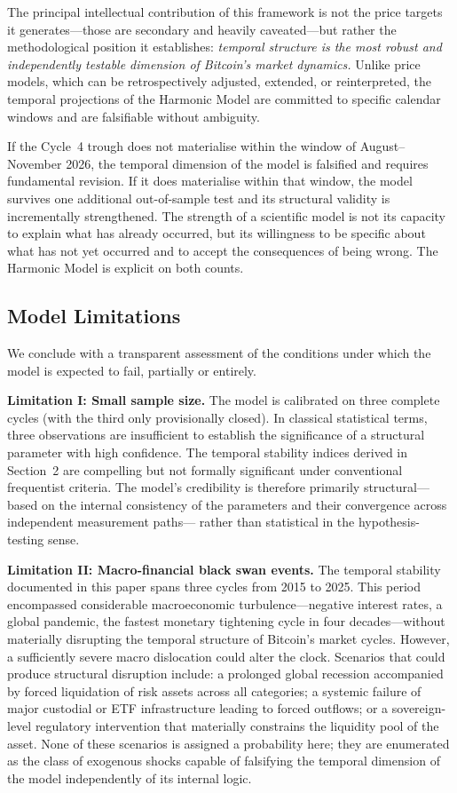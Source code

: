 The principal intellectual contribution of this framework is not the price
targets it generates---those are secondary and heavily caveated---but rather
the methodological position it establishes: \textit{temporal structure is
the most robust and independently testable dimension of Bitcoin's market
dynamics.} Unlike price models, which can be retrospectively adjusted,
extended, or reinterpreted, the temporal projections of the Harmonic Model
are committed to specific calendar windows and are falsifiable without
ambiguity.

If the Cycle~4 trough does not materialise within the window of August--
November 2026, the temporal dimension of the model is falsified and requires
fundamental revision. If it does materialise within that window, the model
survives one additional out-of-sample test and its structural validity is
incrementally strengthened. The strength of a scientific model is not its
capacity to explain what has already occurred, but its willingness to be
specific about what has not yet occurred and to accept the consequences of
being wrong. The Harmonic Model is explicit on both counts.

\subsection{Model Limitations}

We conclude with a transparent assessment of the conditions under which the
model is expected to fail, partially or entirely.

\textbf{Limitation I: Small sample size.} The model is calibrated on three
complete cycles (with the third only provisionally closed). In classical
statistical terms, three observations are insufficient to establish the
significance of a structural parameter with high confidence. The temporal
stability indices derived in Section~2 are compelling but not formally
significant under conventional frequentist criteria. The model's credibility
is therefore primarily structural---based on the internal consistency of the
parameters and their convergence across independent measurement paths---
rather than statistical in the hypothesis-testing sense.

\textbf{Limitation II: Macro-financial black swan events.} The temporal
stability documented in this paper spans three cycles from 2015 to 2025. This
period encompassed considerable macroeconomic turbulence---negative interest
rates, a global pandemic, the fastest monetary tightening cycle in four
decades---without materially disrupting the temporal structure of Bitcoin's
market cycles. However, a sufficiently severe macro dislocation could alter
the clock. Scenarios that could produce structural disruption include: a
prolonged global recession accompanied by forced liquidation of risk assets
across all categories; a systemic failure of major custodial or ETF
infrastructure leading to forced outflows; or a sovereign-level regulatory
intervention that materially constrains the liquidity pool of the asset.
None of these scenarios is assigned a probability here; they are enumerated
as the class of exogenous shocks capable of falsifying the temporal dimension
of the model independently of its internal logic.

